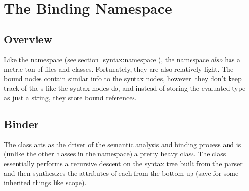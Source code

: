 \documentclass{article}
\begin{document}





\section{The Binding Namespace}
\label{binding:namespace}

\subsection{Overview}
\label{binding:overview}
Like the  namespace (see section \ref{syntax:namespace}), the  namespace \emph{also} has a metric ton of files and classes.
Fortunately, they are also relatively light.
The bound nodes contain similar info to the syntax nodes, however, they don't keep track of the s like the syntax nodes do, and instead of storing the evaluated type as just a string, they store bound  references.

\subsection{Binder}
\label{binding:binder}
The  class acts as the driver of the semantic analysis and binding process and is (unlike the other classes in the namespace) a pretty heavy class.
The  class essentially performs a recursive descent on the syntax tree built from the parser and then synthesizes the attributes of each  from the bottom up (save for some inherited things like scope).


\end{document}
